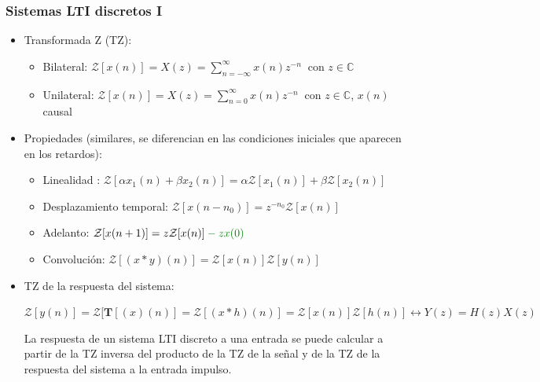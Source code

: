 \begin{frame}
\frametitle{Sistemas LTI discretos I}

\vspace{-0,3cm}


\begin{itemize}
\item <1-> \alert{Transformada Z (TZ)}:

\begin{itemize}
\item Bilateral:    $\mathcal{Z}{[x(n)]}\!=\!X(z)\!=\! \sum_{n=-\infty}^{\infty} \! \!x(n) z^{-n}  \:$ con   $z\! \in\! \mathbb{C}$

\vspace{0.1cm}

\item \color{olivegreen} Unilateral:    $\mathcal{Z}{[x(n)]}\!=\!X(z)\!= \!\sum_{n=0}^{\infty} \! \! x(n) z^{-n}  \:$ con   $z\! \in\! \mathbb{C}$, $x(\!n\!)$ causal \color{black}

\vspace{-0.4cm}

\end{itemize}

\item <2-> \alert{Propiedades} (similares, se diferencian en las condiciones iniciales que aparecen en los retardos):

\begin{itemize}
\item Linealidad : $\mathcal{Z}[\alpha x_1(n)+\beta  x_2(n)]=\alpha \mathcal{Z}[x_1(n)]+\beta \mathcal{Z}[x_2(n)]$
\vspace{0.2cm}
\item Desplazamiento temporal: $\mathcal{Z}[x(n-n_0)]=z^{-n_0} \mathcal{Z}[x(n)]$
\vspace{0.2cm}
\item Adelanto: $\mathcal{Z}[ x(n+1)]=z \mathcal{Z}[x(n)]\color{olivegreen}-z x(0)\color{black}$
\vspace{0.2cm}
\item Convolución: $\mathcal{Z}[{(x*y)(n)}]= \mathcal{Z}[x(n)]\mathcal{Z}[y(n)]$
\end{itemize}

\item <3-> \alert{TZ de la respuesta del sistema}:

\vspace{0.2cm}

\footnotesize $\mathcal{Z}[ y(n)]\!=\!\mathcal{Z}[ \bm T[{(x)(n)}]\!=\!\mathcal{Z}[{(x*h)(n)}]\!=\!\mathcal{Z}[{x(n)}]\mathcal{Z}[{h(n)}]   \leftrightarrow     Y(z)\!=\!H(z)X(z)$  

\vspace{0.2cm}

La respuesta de un sistema LTI discreto a una entrada se puede calcular a partir de la TZ inversa del producto de la TZ de la señal y de la TZ de la respuesta del sistema a la entrada impulso. 
\end{itemize}


\end{frame}

